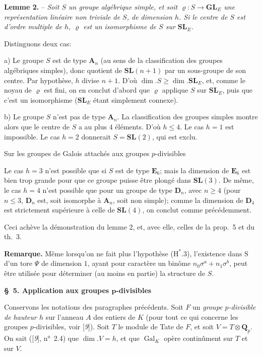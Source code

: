 \textbf{Lemme 2.} -- \textit{Soit $S$ un groupe algébrique simple, et soit $\varrho:S\to\mathbf{GL}_E$ une représentation linéaire non triviale de $S$, de dimension $h$. Si le centre de $S$ est d’ordre multiple de $h$, $\varrho$ est un isomorphisme de $S$ sur $\mathbf{SL}_E$.}

Distinguons deux cas:

a) Le groupe $S$ est de type $\mathbf{A}_n$ (au sens de la classification des groupes algébriques simples), donc quotient de $\mathbf{SL}(n+1)$ par un sous-groupe de son centre. Par hypothèse, $h$ divise $n+1$. D’où $\dim. S\geqslant\dim.\mathbf{SL}_E$, et, comme le noyau de $\varrho$ est fini, on en conclut d’abord que $\varrho$ applique $S$ sur $\mathbf{SL}_E$, puis que c’est un isomorphisme ($\mathbf{SL}_E$ étant simplement connexe).

b) Le groupe $S$ n’est pas de type $\mathbf{A}_n$. La classification des groupes simples montre alors que le centre de $S$ a au plus $4$ éléments. D’où $h\leqslant 4$. Le cas $h=1$ est impossible. Le cas $h=2$ donnerait $S=\mathbf{SL}(2)$, qui est exclu.
\begin{center}\small Sur les groupes de Galois attachés aux groupes $p$-divisibles\end{center}
Le cas $h=3$ n’est possible que si $S$ est de type $\mathbf{E}_6$; mais la dimension de $\mathbf{E}_6$ est bien trop grande pour que ce groupe puisse être plongé dans $\mathbf{SL}(3)$. De même, le cas $h=4$ n’est possible que pour un groupe de type $\mathbf{D}_n$, avec $n\geqslant 4$ (pour $n\leqslant 3$, $\mathbf{D}_n$ est, soit isomorphe à $\mathbf{A}_n$, soit non simple); comme la dimension de $\mathbf{D}_4$ est strictement supérieure à celle de $\mathbf{SL}(4)$, on conclut comme précédemment.

Ceci achève la démonstration du lemme 2, et, avec elle, celles de la prop.~5 et du th.~3.

\textbf{Remarque.} Même lorsqu’on ne fait plus l’hypothèse ($\mathrm{H}^{*}$.3), l’existence dans $\mathrm{S}$ d’un tore $\varPsi$ de dimension $1$, ayant pour caractère un binôme $n_0\sigma^a+n_1\sigma^b$, peut être utilisée pour déterminer (au moins en partie) la structure de $S$.

\begin{center}\textbf{\S~5. Application aux groupes $\boldsymbol{p}$-divisibles}\end{center}

Conservons les notations des paragraphes précédents. Soit $F$ un \textit{groupe $p$-divisible de hauteur $h$} sur l’anneau $A$ des entiers de $K$ (pour tout ce qui concerne les groupes $p$-divisibles, voir [\textit{9}]). Soit $T$ le module de Tate de $F$, et soit $V=T\otimes\mathbf{Q}_p$. On sait ([\textit{9}], n°~2.4) que $\dim. V=h$, et que $\operatorname{Gal}_K$ opère continûment sur $T$ et sur $V$.

